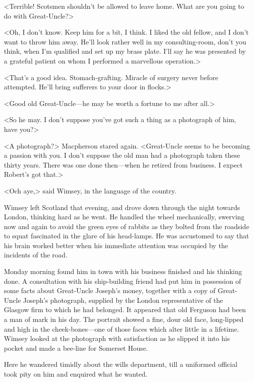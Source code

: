<Terrible! Scotsmen shouldn't be allowed to leave home. What are you going to do with Great-Uncle?>

<Oh, I don't know. Keep him for a bit, I think. I liked the old fellow, and I don't want to throw him away. He'll look rather well in my consulting-room, don't you think, when I'm qualified and set up my brass plate. I'll say he was presented by a grateful patient on whom I performed a marvellous operation.>

<That's a good idea. Stomach-grafting. Miracle of surgery never before attempted. He'll bring sufferers to your door in flocks.>

<Good old Great-Uncle—he may be worth a fortune to me after all.>

<So he may. I don't suppose you've got such a thing as a photograph of him, have you?>

<A photograph?> Macpherson stared again. <Great-Uncle seems to be becoming a passion with you. I don't suppose the old man had a photograph taken these thirty years. There was one done then—when he retired from business. I expect Robert's got that.>

<Och aye,> said Wimsey, in the language of the country.

Wimsey left Scotland that evening, and drove down through the night towards London, thinking hard as he went. He handled the wheel mechanically, swerving now and again to avoid the green eyes of rabbits as they bolted from the roadside to squat fascinated in the glare of his head-lamps. He was accustomed to say that his brain worked better when his immediate attention was occupied by the incidents of the road.

Monday morning found him in town with his business finished and his thinking done. A consultation with his ship-building friend had put him in possession of some facts about Great-Uncle Joseph's money, together with a copy of Great-Uncle Joseph's photograph, supplied by the London representative of the Glasgow firm to which he had belonged. It appeared that old Ferguson had been a man of mark in his day. The portrait showed a fine, dour old face, long-lipped and high in the cheek-bones—one of those faces which alter little in a lifetime. Wimsey looked at the photograph with satisfaction as he slipped it into his pocket and made a bee-line for Somerset House.

Here he wandered timidly about the wills department, till a uniformed official took pity on him and enquired what he wanted.

